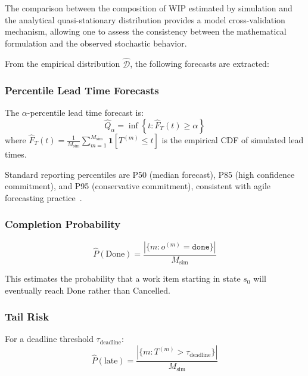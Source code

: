 The comparison between the composition of WIP estimated by simulation and the analytical quasi-stationary distribution provides a model cross-validation mechanism, allowing one to assess the consistency between the mathematical formulation and the observed stochastic behavior.


From the empirical distribution $\hat{\mathcal{D}}$, the following 
forecasts are extracted:

\subsubsection{Percentile Lead Time Forecasts}

\begin{definition}
\label{def:percentile-forecast}
The $\alpha$-percentile lead time forecast is:
\begin{equation}
\label{eq:percentile}
\hat{Q}_\alpha = \inf \left\{ t : \hat{F}_T(t) \geq \alpha \right\}
\end{equation}
where $\hat{F}_T(t) = \frac{1}{M_{\text{sim}}} 
    \sum_{m=1}^{M_{\text{sim}}} \mathbf{1}[T^{(m)} \leq t]$ 
is the empirical CDF of simulated lead times.
\end{definition}

Standard reporting percentiles are P50 (median forecast), P85 (high 
confidence commitment), and P95 (conservative commitment), consistent 
with agile forecasting practice~\cite{vacanti2015}.

\subsubsection{Completion Probability}

\begin{equation}
\label{eq:completion-prob}
\hat{P}(\text{Done}) = \frac{|\{m : o^{(m)} = \texttt{done}\}|}{M_{\text{sim}}}
\end{equation}

This estimates the probability that a work item starting in state $s_0$ 
will eventually reach Done rather than Cancelled.

\subsubsection{Tail Risk}

\begin{definition}
\label{def:tail-risk}
For a deadline threshold $\tau_{\text{deadline}}$:
\begin{equation}
\label{eq:tail-risk}
\hat{P}(\text{late}) = \frac{|\{m : T^{(m)} > \tau_{\text{deadline}}\}|}{M_{\text{sim}}}
\end{equation}
\end{definition}

